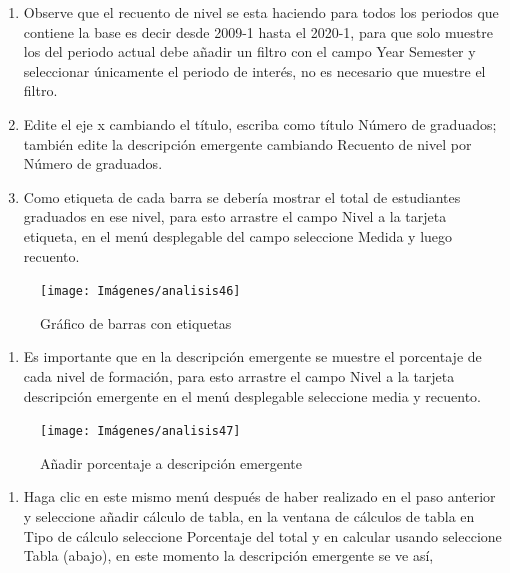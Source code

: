 \documentclass[
]{book}
\providecommand{\tightlist}{%
  \setlength{\itemsep}{0pt}\setlength{\parskip}{0pt}}
\begin{document}
\begin{enumerate}
\def\labelenumi{\arabic{enumi}.}
\setcounter{enumi}{7}
\item
  Observe que el recuento de nivel se esta haciendo para todos los periodos que contiene la base es decir desde 2009-1 hasta el 2020-1, para que solo muestre los del periodo actual debe añadir un filtro con el campo Year Semester y seleccionar únicamente el periodo de interés, no es necesario que muestre el filtro.
\item
  Edite el eje x cambiando el título, escriba como título Número de graduados; también edite la descripción emergente cambiando Recuento de nivel por Número de graduados.
\item
  Como etiqueta de cada barra se debería mostrar el total de estudiantes graduados en ese nivel, para esto arrastre el campo Nivel a la tarjeta etiqueta, en el menú desplegable del campo seleccione Medida y luego recuento.
\end{enumerate}

\begin{figure}

{\centering \texttt{[image: Imágenes/analisis46]} 

}

\caption{Gráfico de barras con etiquetas}\label{fig:paso10graficobarras-fig}
\end{figure}

\begin{enumerate}
\def\labelenumi{\arabic{enumi}.}
\setcounter{enumi}{10}
\tightlist
\item
  Es importante que en la descripción emergente se muestre el porcentaje de cada nivel de formación, para esto arrastre el campo Nivel a la tarjeta descripción emergente en el menú desplegable seleccione media y recuento.
\end{enumerate}

\begin{figure}

{\centering \texttt{[image: Imágenes/analisis47]} 

}

\caption{Añadir porcentaje a descripción emergente}\label{fig:paso11graficobarras-fig}
\end{figure}

\begin{enumerate}
\def\labelenumi{\arabic{enumi}.}
\setcounter{enumi}{11}
\tightlist
\item
  Haga clic en este mismo menú después de haber realizado en el paso anterior y seleccione añadir cálculo de tabla, en la ventana de cálculos de tabla en Tipo de cálculo seleccione Porcentaje del total y en calcular usando seleccione Tabla (abajo), en este momento la descripción emergente se ve así,
\end{enumerate}
\end{document}

